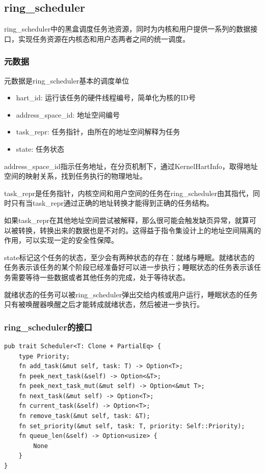 \subsection{ring\_scheduler}


ring\_scheduler中的黑盒调度任务池资源，同时为内核和用户提供一系列的数据接口，实现任务资源在内核态和用户态两者之间的统一调度。

\subsubsection{元数据}

元数据是ring\_scheduler基本的调度单位

\begin{itemize}
\item hart\_id: 运行该任务的硬件线程编号，简单化为核的ID号
\item address\_space\_id: 地址空间编号
\item task\_repr: 任务指针，由所在的地址空间解释为任务
\item state: 任务状态
\end{itemize}


address\_space\_id指示任务地址，在分页机制下，通过KernelHartInfo，取得地址空间的映射关系，找到任务执行的物理地址。

task\_repr是任务指针，内核空间和用户空间的任务在ring\_scheduler由其指代，同时只有当task\_repr通过正确的地址转换才能得到正确的任务结构。

如果task\_repr在其他地址空间尝试被解释，那么很可能会触发缺页异常，就算可以被转换，转换出来的数据也是不对的。这得益于指令集设计上的地址空间隔离的作用，可以实现一定的安全性保障。


state标记这个任务的状态，至少会有两种状态的存在：就绪与睡眠。就绪状态的任务表示该任务的某个阶段已经准备好可以进一步执行；睡眠状态的任务表示该任务需要等待一些数据或者其他任务的完成，处于等待状态。

就绪状态的任务可以被ring\_scheduler弹出交给内核或用户运行，睡眠状态的任务只有被唤醒器唤醒之后才能转成就绪状态，然后被进一步执行。

\subsubsection{ring\_scheduler的接口}

\begin{lstlisting}[caption=调度器的接口约束]
pub trait Scheduler<T: Clone + PartialEq> {
    type Priority;
    fn add_task(&mut self, task: T) -> Option<T>;
    fn peek_next_task(&self) -> Option<&T>;
    fn peek_next_task_mut(&mut self) -> Option<&mut T>;
    fn next_task(&mut self) -> Option<T>;
    fn current_task(&self) -> Option<T>;
    fn remove_task(&mut self, task: &T);
    fn set_priority(&mut self, task: T, priority: Self::Priority);
    fn queue_len(&self) -> Option<usize> {
        None
    }
}
\end{lstlisting}


